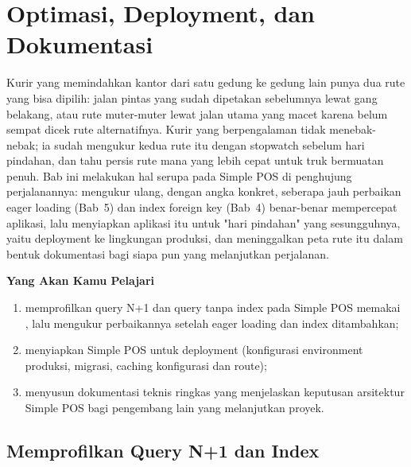 
\chapter{Optimasi, Deployment, dan Dokumentasi}
\label{ch:optimasi-dan-deployment}


Kurir yang memindahkan kantor dari satu gedung ke gedung lain punya dua
rute yang bisa dipilih: jalan pintas yang sudah dipetakan sebelumnya
lewat gang belakang, atau rute muter-muter lewat jalan utama yang macet
karena belum sempat dicek rute alternatifnya. Kurir yang berpengalaman
tidak menebak-nebak; ia sudah mengukur kedua rute itu dengan stopwatch
sebelum hari pindahan, dan tahu persis rute mana yang lebih cepat untuk
truk bermuatan penuh. Bab ini melakukan hal serupa pada Simple POS di
penghujung perjalanannya: mengukur ulang, dengan angka konkret, seberapa
jauh perbaikan eager loading (Bab~5) dan index foreign key (Bab~4)
benar-benar mempercepat aplikasi, lalu menyiapkan aplikasi itu untuk
"hari pindahan" yang sesungguhnya, yaitu deployment ke lingkungan
produksi, dan meninggalkan peta rute itu dalam bentuk dokumentasi bagi
siapa pun yang melanjutkan perjalanan.

\textbf{Yang Akan Kamu Pelajari}

\begin{enumerate}
  \item memprofilkan query N+1 dan query tanpa index pada Simple POS memakai , lalu mengukur perbaikannya setelah eager loading dan index ditambahkan;
  \item menyiapkan Simple POS untuk deployment (konfigurasi environment produksi, migrasi, caching konfigurasi dan route);
  \item menyusun dokumentasi teknis ringkas yang menjelaskan keputusan arsitektur Simple POS bagi pengembang lain yang melanjutkan proyek.
\end{enumerate}

\section{Memprofilkan Query N+1 dan Index}
\label{sec:optimasi-dan-deployment-1}

